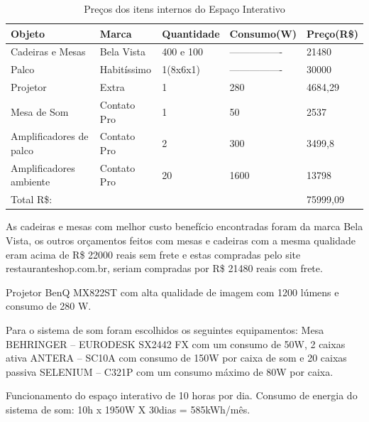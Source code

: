 \begin{table}[h]
\centering
\caption{Preços dos itens internos do Espaço Interativo}
\label{PrecoInternoEspacoInterativo}
\begin{tabular}{|l|l|l|l|l|}
\hline
Objeto                  & Marca       & Quantidade & Consumo(W)       & Preço(R\$) \\ \hline
Cadeiras e Mesas        & Bela Vista  & 400 e 100  & ---------------- & 21480      \\ \hline
Palco                   & Habitíssimo & 1(8x6x1)   & ---------------- & 30000      \\ \hline
Projetor                & Extra       & 1          & 280              & 4684,29    \\ \hline
Mesa de Som             & Contato Pro & 1          & 50               & 2537       \\ \hline
Amplificadores de palco & Contato Pro & 2          & 300              & 3499,8     \\ \hline
Amplificadores ambiente & Contato Pro & 20         & 1600             & 13798      \\ \hline
Total R\$:              &             &            &                  & 75999,09   \\ \hline
\end{tabular}
\end{table}

	As cadeiras e mesas com melhor custo benefício encontradas foram da marca Bela Vista, os outros orçamentos feitos com mesas e cadeiras com a mesma qualidade eram acima de R\$ 22000 reais sem frete e estas compradas pelo site restauranteshop.com.br, seriam compradas por R\$ 21480 reais com frete.
	
	Projetor BenQ MX822ST com alta qualidade de imagem com 1200 lúmens e consumo de 280 W.
	
	Para o sistema de som foram escolhidos os seguintes equipamentos: Mesa BEHRINGER – EURODESK SX2442 FX com um consumo de 50W, 2 caixas ativa ANTERA – SC10A com consumo de 150W por caixa de som e  20 caixas passiva SELENIUM – C321P com um consumo máximo de 80W por caixa.
	
	Funcionamento do espaço interativo de 10 horas por dia.
	Consumo de energia do sistema de som: 10h x 1950W X 30dias = 585kWh/mês.
	
